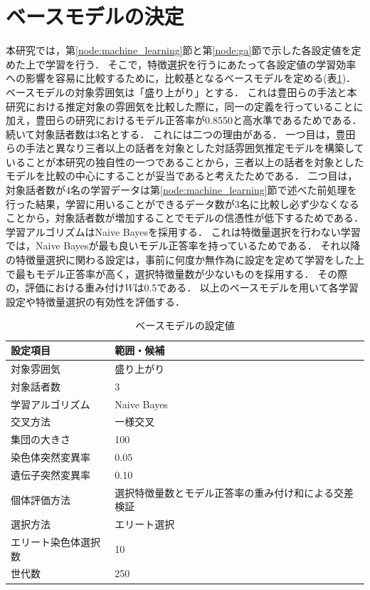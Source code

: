 

\section{ベースモデルの決定\label{node:base_model}}

本研究では，第\ref{node:machine_learning}節と第\ref{node:ga}節で示した各設定値を定めた上で学習を行う．
そこで，特徴選択を行うにあたって各設定値の学習効率への影響を容易に比較するために，比較基となるベースモデルを定める(表\ref{tab:base_model_setting})．
ベースモデルの対象雰囲気は「盛り上がり」とする．
これは豊田らの手法と本研究における推定対象の雰囲気を比較した際に，同一の定義を行っていることに加え，豊田らの研究におけるモデル正答率が0.8550と高水準であるためである．
続いて対象話者数は3名とする．
これには二つの理由がある．
一つ目は，豊田らの手法と異なり三者以上の話者を対象とした対話雰囲気推定モデルを構築していることが本研究の独自性の一つであることから，三者以上の話者を対象としたモデルを比較の中心にすることが妥当であると考えたためである．
二つ目は，対象話者数が4名の学習データは第\ref{node:machine_learning}節で述べた前処理を行った結果，学習に用いることができるデータ数が3名に比較し必ず少なくなることから，対象話者数が増加することでモデルの信憑性が低下するためである．
学習アルゴリズムはNaive Bayesを採用する．
これは特徴量選択を行わない学習では，Naive Bayesが最も良いモデル正答率を持っているためである．
それ以降の特徴量選択に関わる設定は，事前に何度か無作為に設定を定めて学習をした上で最もモデル正答率が高く，選択特徴量数が少ないものを採用する．
その際の，評価における重み付け$W$は0.5である．
以上のベースモデルを用いて各学習設定や特徴量選択の有効性を評価する．

\begin{table}[t]
    \caption{ベースモデルの設定値}
    \centering
    \begin{tabular}{ll}
        \hline
        設定項目 & 範囲・候補 \\ \hline\hline
        対象雰囲気 & 盛り上がり \\ \hline
        対象話者数 & 3 \\ \hline
        学習アルゴリズム & Naive Bayes \\ \hline
        交叉方法 & 一様交叉 \\ \hline
        集団の大きさ & 100 \\ \hline
        染色体突然変異率 & 0.05 \\ \hline
        遺伝子突然変異率 & 0.10 \\ \hline
        個体評価方法 & 選択特徴量数とモデル正答率の重み付け和による交差検証 \\ \hline
        選択方法 & エリート選択 \\ \hline
        エリート染色体選択数 & 10 \\ \hline
        世代数 & 250 \\ \hline
    \end{tabular}
    \label{tab:base_model_setting}
\end{table}


